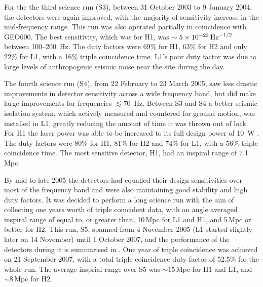 \documentclass{article}
\begin{document}
For the the third science run (S3), between 31 October 2003 to 9 January 2004,
the detectors were again improved, with the majority of sensitivity increase in
the mid-frequency range. This run was also operated partially in coincidence
with GEO600. The best sensitivity, which was for H1, was
$\sim5\times10^{-23}\,{\rm Hz}^{-1/2}$ between 100--200~Hz. The duty factors
were 69\% for H1, 63\% for H2 and only 22\% for L1, with a 16\% triple
coincidence time. L1's poor duty factor was due to large levels of anthropogenic
seismic noise near the site during the day.

The fourth science run (S4), from 22 February to 23 March 2005, saw less drastic
improvements in detector sensitivity across a wide frequency band, but did make
large improvements for frequencies $\lesssim 70$~Hz. Between S3 and S4 a better
seismic isolation system, which actively measured and countered for ground
motion, was installed in L1, greatly reducing the amount of time it was thrown
out of lock. For H1 the laser power was able to be increased to its full design
power of 10~W \cite{Abbott:2007b}. The duty factors were 80\% for H1, 81\% for
H2 and 74\% for L1, with a 56\% triple coincidence time. The most sensitive
detector, H1, had an inspiral range of 7.1\,Mpc.

By mid-to-late 2005 the detectors had equalled their design sensitivities over
most of the frequency band and were also maintaining good stability and high
duty factors. It was decided to perform a long science run with the aim of
collecting one years worth of triple coincident data, with an angle averaged
inspiral range of equal to, or greater than, 10\,Mpc for L1 and H1, and 5\,Mpc
or better for H2. This run, S5, spanned from 4 November 2005 (L1 started
slightly later on 14 November) until 1 October 2007, and the performance of the
detectors during it is summarised in \cite{LIGOS5}. One year of triple
coincidence was achieved on 21 September 2007, with a total triple coincidence
duty factor of 52.5\% for the whole run. The average insprial range over S5
was $\sim15$\,Mpc for H1 and L1, and $\sim8$\,Mpc for H2.
\end{document}
